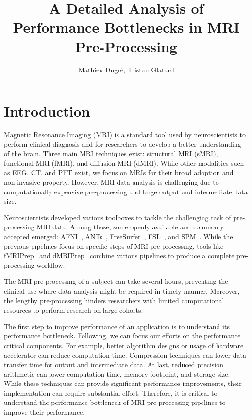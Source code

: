 \documentclass[conference]{IEEEtran}
\title{A Detailed Analysis of Performance Bottlenecks in MRI Pre-Processing}
\author{Mathieu Dugr\'e, Tristan Glatard}
\begin{document}
\maketitle

\begin{abstract}
																																																																																																																																																						
\end{abstract}

\section{Introduction}
Magnetic Resonance Imaging (MRI) is a standard tool used by neuroscientists to perform clinical diagnosis and for researchers to develop a better understanding of the brain. Three main MRI techniques exist: structural MRI (sMRI), functional MRI (fMRI), and diffusion MRI (dMRI). While other modalities such as EEG, CT, and PET exist, we focus on MRIs for their broad adoption and non-invasive property. However, MRI data analysis is challenging due to computationally expensive pre-processing and large output and intermediate data size.

Neuroscientists developed various toolboxes to tackle the challenging task of pre-processing MRI data. Among those, some openly available and commonly accepted emerged: AFNI~\cite{Cox1996-sl}, ANTs~\cite{Avants_undated-fu}, FreeSurfer~\cite{Fischl2012-bp}, FSL~\cite{Jenkinson2012-cq}, and SPM~\cite{Friston2007-ag}. While the previous pipelines focus on specific steps of MRI pre-processing, tools like fMRIPrep~\cite{Esteban2019-og} and dMRIPrep~\cite{Michael2021-4515513} combine various pipelines to produce a complete pre-processing workflow.

The MRI pre-processing of a subject can take several hours, preventing the clinical use where data analysis might be required in timely manner. Moreover, the lengthy pre-processing hinders researchers with limited computational resources to perform research on large cohorts.

The first step to improve performance of an application is to understand its performance bottleneck. Following, we can focus our efforts on the performance critical components. For example, better algorithm designs or usage of hardware accelerator can reduce computation time. Compression techniques can lower data transfer time for output and intermediate data. At last, reduced precision arithmetic can lower computation time, memory footprint, and storage size. While these techniques can provide significant performance improvements, their implementation can require substantial effort. Therefore, it is critical to understand the performance bottleneck of MRI pre-processing pipelines to improve their performance.
\end{document}
